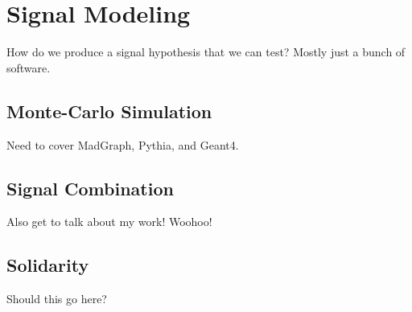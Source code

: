 \chapter{Signal Modeling}

How do we produce a signal hypothesis that we can test?
Mostly just a bunch of software.

\section{Monte-Carlo Simulation}

    Need to cover MadGraph, Pythia, and Geant4.

\section{Signal Combination}

    Also get to talk about my work! Woohoo!

\section{Solidarity}
    
    Should this go here?
